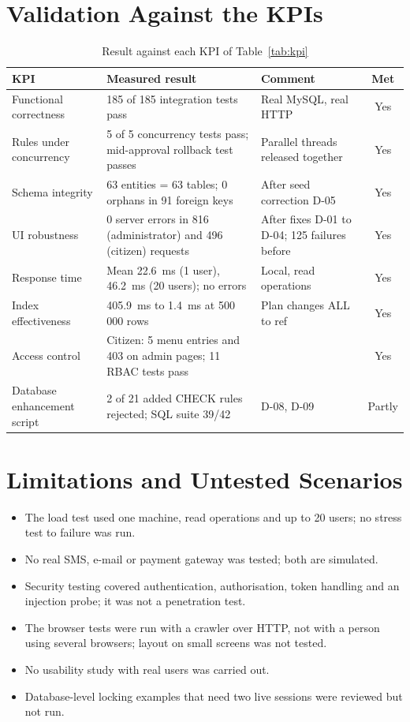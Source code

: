 \section{Validation Against the KPIs}
\begin{table}[H]
\centering\small
\caption{Result against each KPI of Table~\ref{tab:kpi}}\label{tab:kpires}
\begin{tabularx}{\linewidth}{@{}p{3.5cm}p{4.3cm}Xc@{}}
\toprule \textbf{KPI} & \textbf{Measured result} & \textbf{Comment} & \textbf{Met}\\ \midrule
Functional correctness & 185 of 185 integration tests pass & Real MySQL, real HTTP & Yes\\
Rules under concurrency & 5 of 5 concurrency tests pass; mid-approval rollback test passes & Parallel threads released together & Yes\\
Schema integrity & 63 entities = 63 tables; 0 orphans in 91 foreign keys & After seed correction D-05 & Yes\\
UI robustness & 0 server errors in 816 (administrator) and 496 (citizen) requests & After fixes D-01 to D-04; 125 failures before & Yes\\
Response time & Mean 22.6~ms (1 user), 46.2~ms (20 users); no errors & Local, read operations & Yes\\
Index effectiveness & 405.9~ms to 1.4~ms at 500\,000 rows & Plan changes ALL to ref & Yes\\
Access control & Citizen: 5 menu entries and 403 on admin pages; 11 RBAC tests pass & & Yes\\
Database enhancement script & 2 of 21 added CHECK rules rejected; SQL suite 39/42 & D-08, D-09 & Partly\\
\bottomrule
\end{tabularx}
\end{table}

\section{Limitations and Untested Scenarios}
\begin{itemize}
\item The load test used one machine, read operations and up to 20 users; no stress test to failure was run.
\item No real SMS, e-mail or payment gateway was tested; both are simulated.
\item Security testing covered authentication, authorisation, token handling and an injection probe; it was not a penetration test.
\item The browser tests were run with a crawler over HTTP, not with a person using several browsers; layout on small screens was not tested.
\item No usability study with real users was carried out.
\item Database-level locking examples that need two live sessions were reviewed but not run.
\end{itemize}
